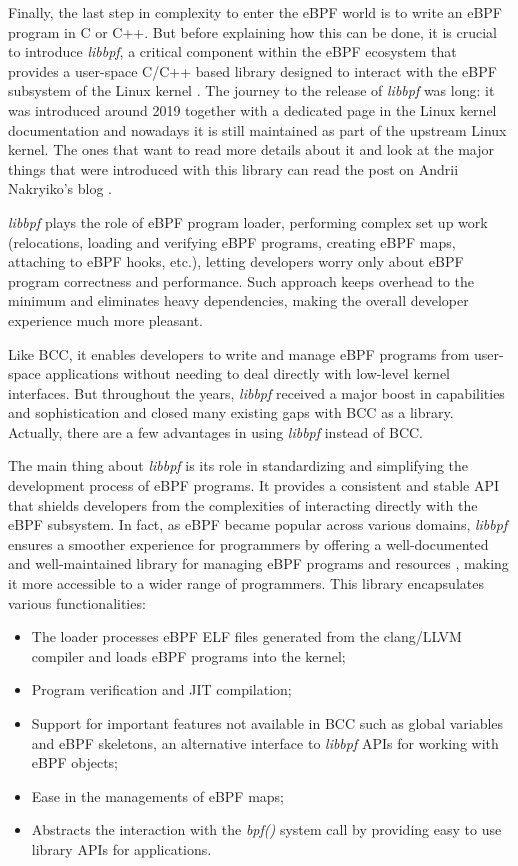 Finally, the last step in complexity to enter the eBPF world is to write an eBPF program in C or C++.
But before explaining how this can be done, it is crucial to introduce \textit{libbpf},
a critical component within the eBPF ecosystem that provides a user-space C/C++ based library designed to interact with the eBPF subsystem of the Linux kernel \cite{libbpfGitHub}. 
The journey to the release of \textit{libbpf} was long: it was introduced around 2019 together with a dedicated page in the Linux kernel documentation \cite{libbpfPageLinuxKernelDOc} and nowadays it is still maintained as part of the upstream Linux kernel.
The ones that want to read more details about it and look at the major things that were introduced with this library can read the post on Andrii Nakryiko's blog \cite{libbpfJourney}.

\textit{libbpf} plays the role of eBPF program loader, performing complex set up work (relocations, loading and verifying eBPF programs, creating eBPF maps, attaching to eBPF hooks, etc.), letting developers worry only about eBPF program correctness and performance. 
Such approach keeps overhead to the minimum and eliminates heavy dependencies, making the overall developer experience much more pleasant.

Like BCC, it enables developers to write and manage eBPF programs from user-space applications without needing to deal directly with low-level kernel interfaces.
But throughout the years, \textit{libbpf} received a major boost in capabilities and sophistication and closed many existing gaps with BCC as a library.
Actually, there are a few advantages in using \textit{libbpf} instead of BCC.

The main thing about \textit{libbpf} is its role in standardizing and simplifying the development process of eBPF programs. 
It provides a consistent and stable API that shields developers from the complexities of interacting directly with the eBPF subsystem. 
In fact, as eBPF became popular across various domains, \textit{libbpf} ensures a smoother experience for programmers by offering a well-documented and well-maintained library for managing eBPF programs and resources \cite{libbpfDocumentation}, making it more accessible to a wider range of programmers.
This library encapsulates various functionalities:

\begin{itemize}
	\item The loader processes eBPF ELF files generated from the 
		clang/LLVM compiler and loads eBPF programs into the kernel;
	\item Program verification and JIT compilation;
	\item Support for important features not available in BCC such as global 
		variables and eBPF skeletons, an alternative interface to \textit{libbpf} APIs for working with eBPF objects;
	\item Ease in the managements of eBPF maps;
	\item Abstracts the interaction with the \textit{bpf()} system call by providing 
		easy to use library APIs for applications.
\end{itemize}

